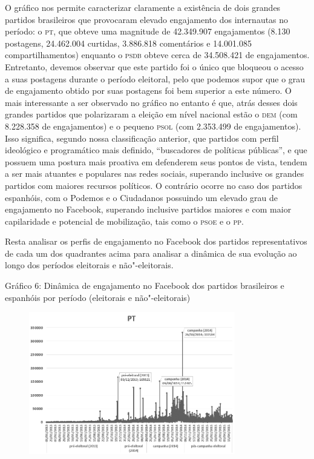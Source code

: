 O gráfico nos permite caracterizar claramente a existência de dois
grandes partidos brasileiros que provocaram elevado engajamento dos
internautas no período: o \textsc{pt}, que obteve uma magnitude de 42.349.907
engajamentos (8.130 postagens, 24.462.004 curtidas, 3.886.818
comentários e 14.001.085 compartilhamentos) enquanto o \textsc{psdb} obteve cerca
de 34.508.421 de engajamentos. Entretanto, devemos observar que este
partido foi o único que bloqueou o acesso a suas postagens durante o
período eleitoral, pelo que podemos supor que o grau de engajamento
obtido por suas postagens foi bem superior a este número. O mais
interessante a ser observado no gráfico no entanto é que, atrás desses
dois grandes partidos que polarizaram a eleição em nível nacional estão
o \textsc{dem} (com 8.228.358 de engajamentos) e o pequeno \textsc{psol} (com 2.353.499 de
engajamentos). Isso significa, segundo nossa classificação anterior, que
partidos com perfil ideológico e programático mais definido,
``buscadores de políticas públicas'', e que possuem uma postura mais
proativa em defenderem seus pontos de vista, tendem a ser mais atuantes
e populares nas redes sociais, superando inclusive os grandes partidos
com maiores recursos políticos. O contrário ocorre no caso dos partidos
espanhóis, com o Podemos e o Ciudadanos possuindo um elevado grau de
engajamento no Facebook, superando inclusive partidos maiores e com
maior capilaridade e potencial de mobilização, tais como o \textsc{psoe} e o \textsc{pp}.

Resta analisar os perfis de engajamento no Facebook dos partidos
representativos de cada um dos quadrantes acima para analisar a dinâmica
de sua evolução ao longo dos períodos eleitorais e não"-eleitorais.

\begin{center}
Gráfico 6: Dinâmica de engajamento no Facebook dos partidos brasileiros
e espanhóis por período (eleitorais e não"-eleitorais)
\end{center}

\begin{figure}[!ht]
\centering
 \includegraphics[width=90mm]{./imgs/graf6_1.png}
\end{figure}

